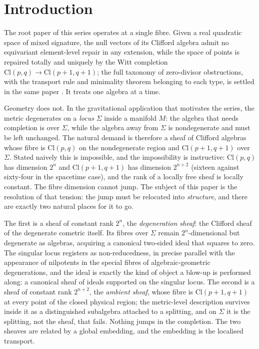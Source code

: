 \documentclass[11pt]{article}
\theoremstyle{definition}
\newcommand{\Cl}{\mathrm{Cl}}
\newcommand{\Sig}{\Sigma}
\begin{document}
\newpage
\section{Introduction}\label{sec:intro}

The root paper of this series operates at a single fibre. Given a real quadratic space of mixed signature, the null vectors of its Clifford algebra admit no equivariant element-level repair in any extension, while the space of points is repaired totally and uniquely by the Witt completion $\Cl(p,q) \to \Cl(p{+}1,q{+}1)$; the full taxonomy of zero-divisor obstructions, with the transport rule and minimality theorem belonging to each type, is settled in the same paper \cite{ButlerT1}. It treats one algebra at a time.

Geometry does not. In the gravitational application that motivates the series, the metric degenerates on a \emph{locus} $\Sig$ inside a manifold $M$: the algebra that needs completion is over $\Sig$, while the algebra away from $\Sig$ is nondegenerate and must be left unchanged. The natural demand is therefore a sheaf of Clifford algebras whose fibre is $\Cl(p,q)$ on the nondegenerate region and $\Cl(p{+}1,q{+}1)$ over $\Sig$. Stated naively this is impossible, and the impossibility is instructive: $\Cl(p,q)$ has dimension $2^n$ and $\Cl(p{+}1,q{+}1)$ has dimension $2^{n+2}$ (sixteen against sixty-four in the spacetime case), and the rank of a locally free sheaf is locally constant. The fibre dimension cannot jump. The subject of this paper is the resolution of that tension: the jump must be relocated into \emph{structure}, and there are exactly two natural places for it to go.

The first is a sheaf of constant rank $2^n$, the \emph{degeneration sheaf}: the Clifford sheaf of the degenerate cometric itself. Its fibres over $\Sig$ remain $2^n$-dimensional but degenerate as algebras, acquiring a canonical two-sided ideal that squares to zero. The singular locus registers as non-reducedness, in precise parallel with the appearance of nilpotents in the special fibres of algebraic-geometric degenerations, and the ideal is exactly the kind of object a blow-up is performed along: a canonical sheaf of ideals supported on the singular locus. The second is a sheaf of constant rank $2^{n+2}$, the \emph{ambient sheaf}, whose fibre is $\Cl(p{+}1,q{+}1)$ at every point of the closed physical region; the metric-level description survives inside it as a distinguished subalgebra attached to a splitting, and on $\Sig$ it is the splitting, not the sheaf, that fails. Nothing jumps in the completion. The two sheaves are related by a global embedding, and the embedding is the localised transport.
\end{document}
